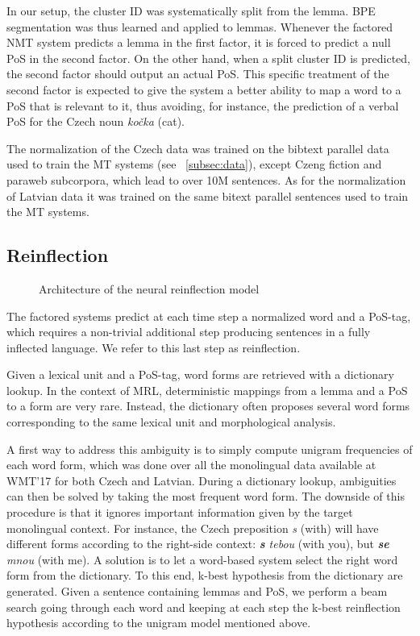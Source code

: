 \documentclass[11pt,letterpaper,final]{article}
\begin{document}
In our setup, the cluster ID was systematically split
from the lemma. BPE segmentation was thus learned and
applied to lemmas. Whenever the factored NMT system predicts a lemma
in the first factor, it is forced to predict a null PoS in the
second factor. On the other hand, when a split cluster ID is
predicted, the second factor should output an actual PoS. This
specific treatment of the second factor is expected to give
the system a better ability to map a word to a PoS that is
relevant to it, thus avoiding, for instance, the prediction
of a verbal PoS for the Czech noun {\it ko\v{c}ka} (cat).

The normalization of the
Czech data was trained on the bibtext parallel data used to train
the MT systems (see  \textsection~\ref{subsec:data}),
except Czeng fiction and paraweb subcorpora,
which lead to over 10M sentences. As for the normalization of Latvian data
it was trained on
the same bitext parallel sentences used to train the MT systems.


\subsection{Reinflection}
\label{subsec:reinflection}

\begin{figure*}[t] %
\centering\resizebox{0.6\textwidth}{!}{%

}
\caption{Architecture of the neural reinflection model}
\label{fig:reinflection_arch}
\end{figure*}

The factored systems predict at each time step a normalized
word and a PoS-tag, which requires a non-trivial additional
step producing sentences in a fully inflected language.
We refer to this last step as reinflection.

Given a lexical unit and a PoS-tag, word forms are retrieved
with a dictionary lookup. In the context of MRL, deterministic
mappings from a lemma and a PoS to a form are very rare. Instead,
the dictionary often proposes several word forms corresponding
to the same lexical unit and morphological analysis.

A first way to address this ambiguity is to simply compute
unigram frequencies of each word form, which was done over
all the monolingual data available at WMT'17 for both Czech
and Latvian. During a dictionary lookup, ambiguities can
then be solved by taking the most frequent word form.
The downside of this procedure is that it ignores important
information given by the target monolingual context. For instance,
the Czech preposition {\it s} (with) will have different
forms according to the right-side context: {\it \textbf{s} tebou} (with you),
but {\it \textbf{se} mnou} (with me). A solution is to
let a word-based system select the right word form from
the dictionary. To this end, k-best hypothesis from the
dictionary are generated. Given a sentence containing lemmas
and PoS, we perform a beam search going through each word and keeping at each
step the k-best reinflection hypothesis according to the
unigram model mentioned above.
\end{document}
